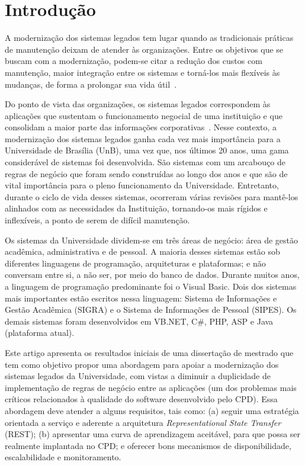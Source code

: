 \section{Introdução}

A modernização dos sistemas 
legados tem lugar quando as 
tradicionais práticas de manutenção deixam de 
atender \`{a}s organizações. Entre os objetivos que se buscam com a modernização, 
podem-se citar a redução dos custos com manutenção, maior integração entre os sistemas e torná-los mais flexíveis às mudanças, 
de forma a prolongar sua vida útil~\cite{S4_bennett1995legacy,S3_Bisbal:1999,S15_Comella-DordaASurvey2000}. 

Do ponto de vista das organizações, os sistemas legados correspondem às aplicações que sustentam o funcionamento 
negocial de uma instituição e que consolidam a maior parte das informações corporativas~\cite{S3_Bisbal:1999}. 
Nesse contexto, a modernização dos sistemas legados ganha cada vez mais importância 
para a Universidade de Brasília (UnB), uma vez que, 
nos últimos 20 anos, uma gama considerável de sistemas foi desenvolvida. 
São sistemas com um arcabouço de regras de negócio que foram sendo 
construídas ao longo dos anos e que são de vital importância para o pleno funcionamento da Universidade. 
Entretanto, durante o ciclo de vida desses sistemas, 
ocorreram várias revisões para mantê-los alinhados com as necessidades da Instituição, 
tornando-os mais rígidos e inflexíveis, 
a ponto de serem de difícil manutenção. 

Os sistemas da Universidade dividem-se em três áreas de negócio: área de gestão acadêmica, administrativa e de pessoal. 
A maioria desses sistemas estão sob diferentes linguagens de programação, arquiteturas e plataformas; e não conversam entre
si, a não ser, por meio do banco de dados. Durante muitos anos, a linguagem de programação predominante foi o Visual Basic. 
Dois dos sistemas mais importantes estão escritos nessa linguagem: Sistema de
Informações e Gestão Acadêmica (SIGRA) e o Sistema de
Informações de Pessoal (SIPES). Os demais sistemas foram
desenvolvidos em VB.NET, C\#, PHP, ASP e Java (plataforma atual). 

Este artigo apresenta os resultados iniciais de uma disserta\c c\~{a}o 
de mestrado que tem como objetivo propor uma abordagem para apoiar 
a modernização dos sistemas legados da Universidade, 
com vistas a diminuir a duplicidade de implementa\c c\~{a}o 
de regras de negócio entre as aplicações (um dos problemas mais 
críticos relacionados à qualidade do software desenvolvido pelo 
CPD). Essa abordagem deve atender a alguns requisitos, tais como: (a) 
seguir uma estrat\'{e}gia orientada a serviço e  
aderente a arquitetura \textit{Representational State Transfer} (REST); 
(b) apresentar uma curva de aprendizagem aceitável, para que possa ser 
realmente implantada no CPD; e oferecer bons mecanismos de disponibilidade, 
escalabilidade e monitoramento.

